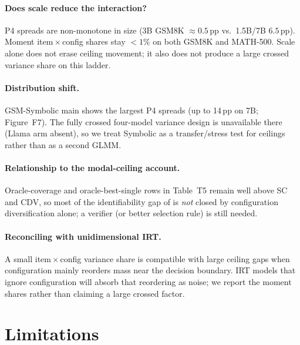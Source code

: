 \paragraph{Does scale reduce the interaction?}
P4 spreads are non-monotone in size (3B GSM8K $\approx 0.5$\,pp vs.\ 1.5B/7B
$6.5$\,pp). Moment item\,$\times$\,config shares stay ${<}1\%$ on both GSM8K and
MATH-500. Scale alone does not erase ceiling movement; it also does not produce
a large crossed variance share on this ladder.

\paragraph{Distribution shift.}
GSM-Symbolic main shows the largest P4 spreads (up to 14\,pp on 7B;
Figure~F7). The fully crossed four-model variance design is unavailable there
(Llama arm absent), so we treat Symbolic as a transfer/stress test for ceilings
rather than as a second GLMM.

\paragraph{Relationship to the modal-ceiling account.}
Oracle-coverage and oracle-best-single rows in Table~T5 remain well above SC and
CDV, so most of the identifiability gap of \citet{bay2026modal} is \emph{not}
closed by configuration diversification alone; a verifier (or better selection
rule) is still needed.

\paragraph{Reconciling with unidimensional IRT.}
A small item\,$\times$\,config variance share is compatible with large ceiling
gaps when configuration mainly reorders mass near the decision boundary. IRT
models that ignore configuration will absorb that reordering as noise; we report
the moment shares rather than claiming a large crossed factor.

\section{Limitations}

